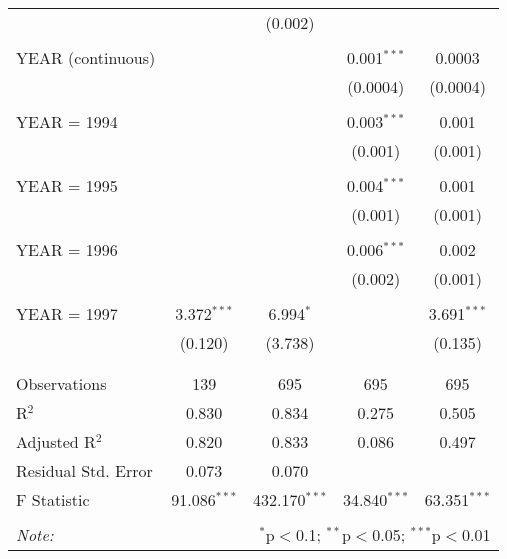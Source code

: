 \documentclass[12pt,a4paper]{article}\usepackage[]{graphicx}\usepackage[]{color}
\begin{document}
\begin{table}[!htbp]
\begin{tabular}{@{\extracolsep{5pt}}lcccc}
  &  & (0.002) &  &  \\ 
  & & & & \\ 
 YEAR (continuous) &  &  & 0.001$^{***}$ & 0.0003 \\ 
  &  &  & (0.0004) & (0.0004) \\ 
  & & & & \\ 
 YEAR = 1994 &  &  & 0.003$^{***}$ & 0.001 \\ 
  &  &  & (0.001) & (0.001) \\ 
  & & & & \\ 
 YEAR = 1995 &  &  & 0.004$^{***}$ & 0.001 \\ 
  &  &  & (0.001) & (0.001) \\ 
  & & & & \\ 
 YEAR = 1996 &  &  & 0.006$^{***}$ & 0.002 \\ 
  &  &  & (0.002) & (0.001) \\ 
  & & & & \\ 
 YEAR = 1997 & 3.372$^{***}$ & 6.994$^{*}$ &  & 3.691$^{***}$ \\ 
  & (0.120) & (3.738) &  & (0.135) \\ 
  & & & & \\ 
\hline \\[-1.8ex] 
Observations & 139 & 695 & 695 & 695 \\ 
R$^{2}$ & 0.830 & 0.834 & 0.275 & 0.505 \\ 
Adjusted R$^{2}$ & 0.820 & 0.833 & 0.086 & 0.497 \\ 
Residual Std. Error & 0.073 & 0.070 &  &  \\ 
F Statistic & 91.086$^{***}$ & 432.170$^{***}$ & 34.840$^{***}$ & 63.351$^{***}$ \\ 
\hline 
\hline \\[-1.8ex] 
\textit{Note:}  & \multicolumn{4}{r}{$^{*}$p$<$0.1; $^{**}$p$<$0.05; $^{***}$p$<$0.01} \\ 
\end{tabular} 
\end{table} 
\end{document}
